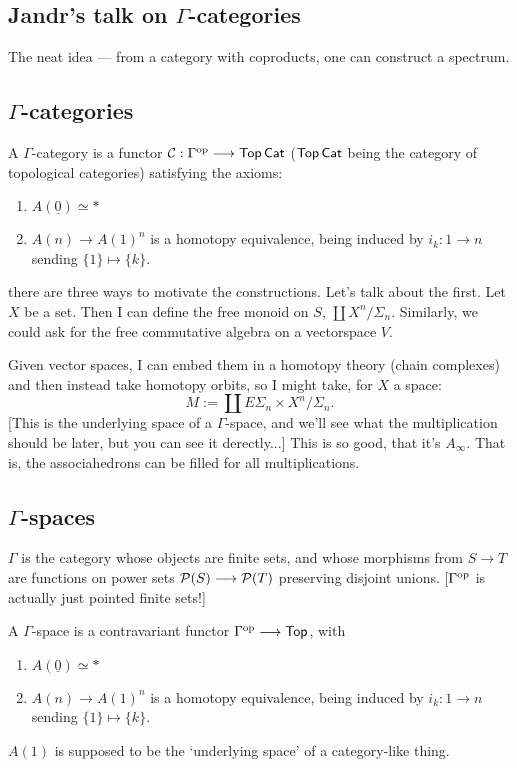 \documentclass[11pt]{article}
\newcommand{\KanSemResponse}[1]
{
\thispagestyle{fancy}
\subsection*{#1}
}
\begin{document}
\begin{JandrGammaSpaces}
\KanSemResponse
{Jandr's talk on $\Gamma$-categories}
The neat idea --- from a category with coproducts, one can construct a spectrum.


\subsection*{$\Gamma$-categories}
A $\Gamma$-category is a functor $\mathcal{C}:\Gamma^{\textup{op}}\longrightarrow\operatorname{{\mathsf{Top}}}\operatorname{{\mathsf{Cat}}}$ ($\operatorname{{\mathsf{Top}}}\operatorname{{\mathsf{Cat}}}$ being the category of topological categories) satisfying the axioms:
\begin{enumerate}\squishlist
\item $A(\underline{0})\simeq*$
\item $A(n)\to A(1)^n$ is a homotopy equivalence, being induced by $i_k:1\to n$ sending $\{1\}\mapsto\{k\}$.
\end{enumerate}




there are three ways to motivate the constructions. Let's talk about the first. Let $X$ be a set. Then I can define the free monoid on $S$, $\coprod X^n/\Sigma_n$. Similarly, we could ask for the free commutative algebra on a vectorspace $V$.

Given vector spaces, I can embed them in a homotopy theory (chain complexes) and then instead take homotopy orbits, so I might take, for $X$ a space:
\[M:=\coprod E\Sigma_n\times X^n/\Sigma_n.\]
[This is the underlying space of a $\Gamma$-space, and we'll see what the multiplication should be later, but you can see it derectly...] This is so good, that it's $A_\infty$. That is, the associahedrons can be filled for all multiplications.

\subsection*{$\Gamma$-spaces}
$\Gamma$ is the category whose objects are finite sets, and whose morphisms from $S\to T$ are functions on power sets $\mathcal{P}(S)\longrightarrow\mathcal{P}(T)$ preserving disjoint unions. [$\Gamma^{\textup{op}}$ is actually just pointed finite sets!]

A $\Gamma$-space is a contravariant functor $\Gamma^{\textup{op}}\longrightarrow\operatorname{{\mathsf{Top}}}$, with
\begin{enumerate}\squishlist
\item $A(\underline{0})\simeq*$
\item $A(n)\to A(1)^n$ is a homotopy equivalence, being induced by $i_k:1\to n$ sending $\{1\}\mapsto\{k\}$.
\end{enumerate}
$A(1)$ is supposed to be the `underlying space' of a category-like thing.


\end{JandrGammaSpaces}
\end{document}

